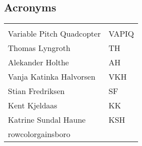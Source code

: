 \begin{center}
\section*{\textbf{Acronyms}}
\begin{tabular}{ll}
\rowcolor{cadetgrey}
    &   \\
Variable Pitch Quadcopter   & VAPIQ \\\rowcolor{gainsboro}
Thomas Lyngroth       & TH          \\ 
Alekander Holthe      & AH          \\\rowcolor{gainsboro}
Vanja Katinka Halvorsen     & VKH   \\
Stian Fredriksen      & SF          \\\rowcolor{gainsboro}
Kent Kjeldaas       & KK            \\
Katrine Sundal Haune    & KSH       \\ rowcolor{gainsboro}
\end{tabular}                                                                   
\end{center}

